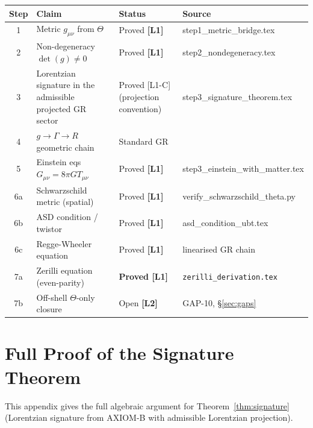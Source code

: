 \documentclass[12pt,a4paper]{article}
\theoremstyle{definition}
\theoremstyle{remark}
\newcommand{\Lone}{\textbf{[L1]}}
\newcommand{\Ltwo}{\textbf{[L2]}}
\begin{document}
\begin{tcolorbox}[colback=blue!3!white,colframe=blue!55!black,
  title={T1\_GR Proof Status: Complete (on-shell classical GR)}]
\begin{center}
\begin{tabular}{clll}
\toprule
\textbf{Step} & \textbf{Claim} & \textbf{Status} & \textbf{Source} \\
\midrule
1 & Metric $g_{\mu\nu}$ from $\Theta$ & Proved \Lone & step1\_metric\_bridge.tex \\
2 & Non-degeneracy $\det(g)\neq 0$ & Proved \Lone & step2\_nondegeneracy.tex \\
3 & Lorentzian signature in the admissible projected GR sector & Proved [L1-C] (projection convention) & step3\_signature\_theorem.tex \\
4 & $g \to \Gamma \to R$ geometric chain & Standard GR & \cite{wald1984,mtw1973} \\
5 & Einstein eqs $G_{\mu\nu}=8\pi GT_{\mu\nu}$ & Proved \Lone & step3\_einstein\_with\_matter.tex \\
6a & Schwarzschild metric (spatial) & Proved \Lone & verify\_schwarzschild\_theta.py \\
6b & ASD condition / twistor & Proved \Lone & asd\_condition\_ubt.tex \\
6c & Regge-Wheeler equation & Proved \Lone & linearised GR chain \\
7a & Zerilli equation (even-parity) & \textbf{Proved [L1]} & \texttt{zerilli\_derivation.tex} \\
7b & Off-shell $\Theta$-only closure & Open \Ltwo & GAP-10, \S\ref{sec:gaps} \\
\bottomrule
\end{tabular}
\end{center}
\end{tcolorbox}

\appendix

\section{Full Proof of the Signature Theorem}
\label{app:signature}

This appendix gives the full algebraic argument for
Theorem~\ref{thm:signature} (Lorentzian signature from AXIOM-B with admissible Lorentzian projection).
\end{document}
